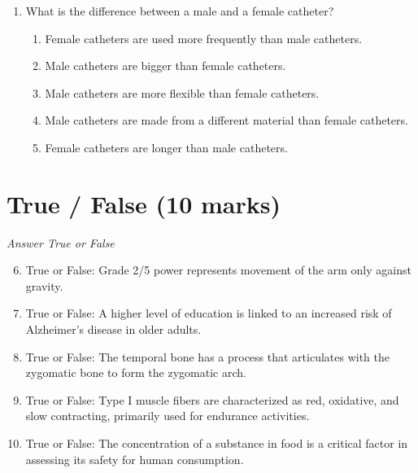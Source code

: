 \documentclass[12pt]{article}
\begin{document}
\begin{enumerate}[label=\arabic*.]
\begin{enumerate}[label=(\alph*)]
    \item Weight-for-age Z score \textless{}-2 and oedema
    \item Height-for-age Z score \textless{}-2 or weight-for-height Z score \textless{}-2 and oedema
    \item Height-for-age Z score \textless{}-3 and oedema
    \item Weight-for-age Z score \textless{}-2 or height-for-age Z score \textless{}-2 or oedema
    \item Height-for-age Z score \textless{}-3 or weight-for-age Z score \textless{}-3 and oedema
\end{enumerate}
\item What is the difference between a male and a female catheter?
\begin{enumerate}[label=(\alph*)]
    \item Female catheters are used more frequently than male catheters.
    \item Male catheters are bigger than female catheters.
    \item Male catheters are more flexible than female catheters.
    \item Male catheters are made from a different material than female catheters.
    \item Female catheters are longer than male catheters.
\end{enumerate}
\end{enumerate}

\section*{True / False (10 marks)}
\textit{Answer True or False}
\begin{enumerate}[label=\arabic*.]
\setcounter{enumi}{5}
\item True or False: Grade 2/5 power represents movement of the arm only against gravity.
\item True or False: A higher level of education is linked to an increased risk of Alzheimer's disease in older adults.
\item True or False: The temporal bone has a process that articulates with the zygomatic bone to form the zygomatic arch.
\item True or False: Type I muscle fibers are characterized as red, oxidative, and slow contracting, primarily used for endurance activities.
\item True or False: The concentration of a substance in food is a critical factor in assessing its safety for human consumption.
\end{enumerate}
\end{document}

